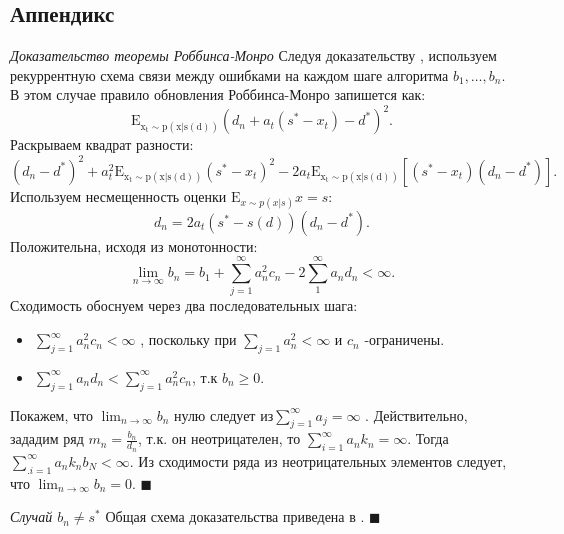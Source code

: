 \documentclass{mipt-thesis-bs}
\begin{document}
\subsection{Аппендикс}
\textit{Доказательство теоремы Роббинса-Монро} \label{monro}
Следуя доказательству \cite{blum1954approximation}, используем рекуррентную схема связи между ошибками на каждом шаге алгоритма $b_1,\dots,b_n$. 
В этом случае правило обновления Роббинса-Монро запишется как: 
\begin{equation}
    \mathrm{E_{x_t \sim p(x|s(d))}}(d_n+a_t(s^*-x_t) -d^*)^2.
\end{equation}
Раскрываем квадрат разности:
\begin{equation}
    (d_n - d^*)^2 + a_t^2 \mathrm{E_{x_t \sim p(x|s(d))}} (s^*-x_t)^2 - 2 a_t \mathrm{E_{x_t \sim p(x|s(d))}}\left[ (s^*-x_t)(d_n-d^*) \right].
\end{equation}
Используем несмещенность оценки $\mathrm{E}_{x \sim p(x|s)} x = s$:
\begin{equation}
    d_n =2 a_t (s^* -s(d))(d_n-d^*).
\end{equation}
Положительна, исходя из монотонности:
\begin{equation}
    \lim_{n \rightarrow \infty} b_n = b_1 + \sum_{j=1}^\infty a_n^2 c_n -2 \sum_1^{\infty} a_n d_n < \infty.
\end{equation}
Сходимость обоснуем через два последовательных шага: \begin{itemize}
    \item  $\sum_{j=1}^\infty a_n^2 c_n < \infty$ , поскольку при $\sum_{j=1} a_n^2 < \infty $ и $c_n$ -ограничены.
    \item $\sum_{j=1}^\infty a_n d_n < \sum_{j=1}^\infty a_n^2 c_n$,  т.к $b_n \ge 0$.
\end{itemize}
Покажем, что $\lim_{n \rightarrow \infty}{b_n}$  нулю следует из$\sum_{j=1}^\infty a_j  =\infty$ .
Действительно, зададим ряд $m_n = \frac{b_n}{d_n}$, т.к. он неотрицателен, то $\sum_{i=1}^{\infty} a_n k_n = \infty $. 
Тогда $\sum_{.i=1}^{\infty} a_n k_n b_N < \infty $. 
Из сходимости ряда из неотрицательных элементов следует, что $\lim_{n \rightarrow \infty}b_n =0$.
$\blacksquare$

\textit{Случай $b_n \ne s^*$} \label{ino}
Общая схема доказательства приведена в \cite{lai1979adaptive}.
$\blacksquare$
\end{document}
